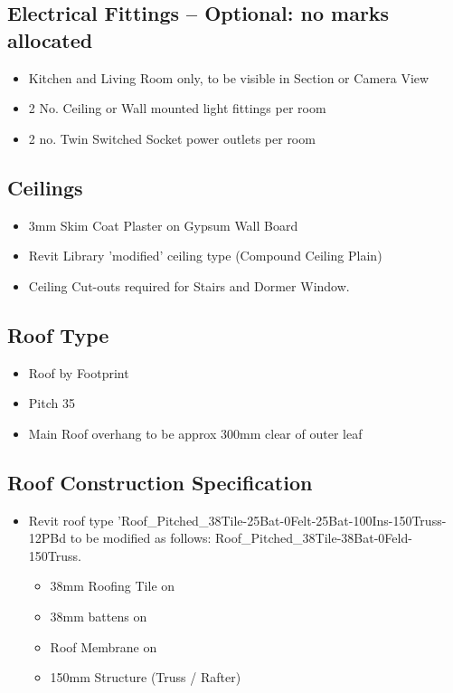 \subsection*{Electrical Fittings -- Optional: no marks allocated}
\begin{itemize}
	\item Kitchen and Living Room only, to be visible in Section or Camera View
	\item 2 No. Ceiling or Wall mounted light fittings per room
	\item 2 no. Twin Switched Socket power outlets per room
\end{itemize}





\subsection*{Ceilings}
\begin{itemize}
	\item 3mm Skim Coat Plaster on Gypsum Wall Board
	\item Revit Library 'modified' ceiling type (Compound Ceiling Plain)
	\item Ceiling Cut-outs required for Stairs and Dormer Window.
\end{itemize}



\subsection*{Roof Type}
\begin{itemize}
	\item Roof by Footprint
	\item Pitch 35\degree
	\item Main Roof overhang to be approx 300mm clear of outer leaf	
\end{itemize}



\subsection*{Roof Construction Specification}
\begin{itemize}
	\item Revit roof type 'Roof\_Pitched\_38Tile-25Bat-0Felt-25Bat-100Ins-150Truss-12PBd to be modified as follows: Roof\_Pitched\_38Tile-38Bat-0Feld-150Truss.
	\begin{itemize}
		\item 38mm Roofing Tile on 
		\item 38mm battens on 
		\item Roof Membrane on 
		\item 150mm Structure (Truss / Rafter)
	\end{itemize}
\end{itemize}




